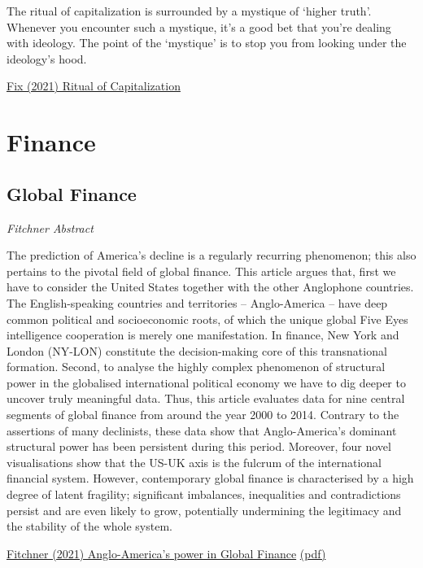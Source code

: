 \documentclass[
]{book}
\begin{document}
The ritual of capitalization is surrounded by a mystique of `higher truth'. Whenever you encounter such a mystique, it's a good bet that you're dealing with ideology. The point of the `mystique' is to stop you from looking under the ideology's hood.

\href{https://economicsfromthetopdown.com/2021/06/02/the-ritual-of-capitalization/}{Fix (2021) Ritual of Capitalization}

\hypertarget{finance-1}{%
\chapter{Finance}\label{finance-1}}

\hypertarget{global-finance}{%
\section{Global Finance}\label{global-finance}}

\emph{Fitchner Abstract}

The prediction of America's decline is a regularly recurring phenomenon; this also pertains to the
pivotal field of global finance. This article argues that, first we have to consider the United States
together with the other Anglophone countries. The English-speaking countries and territories --
Anglo-America -- have deep common political and socioeconomic roots, of which the unique global Five
Eyes intelligence cooperation is merely one manifestation. In finance, New York and London
(NY-LON) constitute the decision-making core of this transnational formation. Second, to analyse the
highly complex phenomenon of structural power in the globalised international political economy we
have to dig deeper to uncover truly meaningful data. Thus, this article evaluates data for nine central
segments of global finance from around the year 2000 to 2014. Contrary to the assertions of many
declinists, these data show that Anglo-America's dominant structural power has been persistent during
this period. Moreover, four novel visualisations show that the US-UK axis is the fulcrum of the
international financial system. However, contemporary global finance is characterised by a high degree
of latent fragility; significant imbalances, inequalities and contradictions persist and are even likely to
grow, potentially undermining the legitimacy and the stability of the whole system.

\href{https://www.cambridge.org/core/journals/review-of-international-studies/article/perpetual-decline-or-persistent-dominance-uncovering-angloamericas-true-structural-power-in-global-finance/75536FC7435F72FC9AB4968D0509F019}{Fitchner (2021) Anglo-America's power in Global Finance}
\href{pdf/Fitchner_2021_anglo-americas-power-in-global-finance.pdf}{(pdf)}
\end{document}
